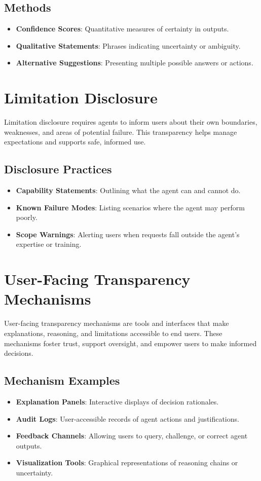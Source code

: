 \begin{TNtwocol}
\subsection{Methods}
\begin{itemize}
    \item \textbf{Confidence Scores}: Quantitative measures of certainty in outputs.
    \item \textbf{Qualitative Statements}: Phrases indicating uncertainty or ambiguity.
    \item \textbf{Alternative Suggestions}: Presenting multiple possible answers or actions.
\end{itemize}

\section{Limitation Disclosure}
Limitation disclosure requires agents to inform users about their own boundaries, weaknesses, and areas of potential failure. This transparency helps manage expectations and supports safe, informed use.

\subsection{Disclosure Practices}
\begin{itemize}
    \item \textbf{Capability Statements}: Outlining what the agent can and cannot do.
    \item \textbf{Known Failure Modes}: Listing scenarios where the agent may perform poorly.
    \item \textbf{Scope Warnings}: Alerting users when requests fall outside the agent’s expertise or training.
\end{itemize}

\section{User-Facing Transparency Mechanisms}
User-facing transparency mechanisms are tools and interfaces that make explanations, reasoning, and limitations accessible to end users. These mechanisms foster trust, support oversight, and empower users to make informed decisions.

\subsection{Mechanism Examples}
\begin{itemize}
    \item \textbf{Explanation Panels}: Interactive displays of decision rationales.
    \item \textbf{Audit Logs}: User-accessible records of agent actions and justifications.
    \item \textbf{Feedback Channels}: Allowing users to query, challenge, or correct agent outputs.
    \item \textbf{Visualization Tools}: Graphical representations of reasoning chains or uncertainty.
\end{itemize}


\end{TNtwocol}
